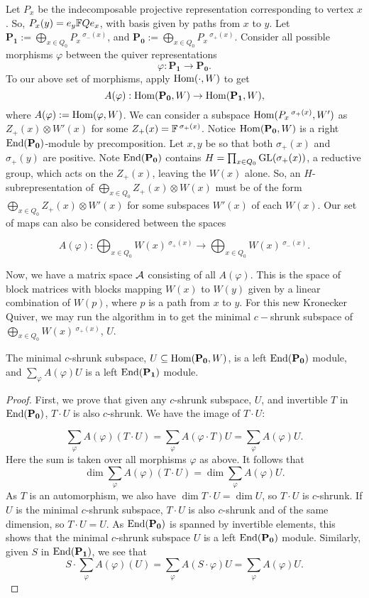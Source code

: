 Let $P_x$ be the indecomposable projective representation corresponding to vertex $x$. So, $P_x(y)=e_y{\mathbb F} Qe_x$, with basis given by paths from $x$ to $y$. Let $\mathbf{P_1}:=\bigoplus_{x\in Q_0}P_x\,^{\sigma_-(x)}$, and $\mathbf{P_0}:=\bigoplus_{x\in Q_0}P_x\,^{\sigma_+(x)}$. Consider all possible morphisms $\varphi$ between the quiver representations $$\varphi:\mathbf{P_1}\rightarrow\mathbf{P_0}.$$
To our above set of morphisms, apply $\operatorname{Hom}(\cdot,W)$ to get
$$A(\varphi):\operatorname{Hom}(\mathbf{P_0},W)\rightarrow\operatorname{Hom}(\mathbf{P_1},W),$$
where $A(\varphi):=\operatorname{Hom}(\varphi,W)$. We can consider a subspace $\operatorname{Hom}(P_x\,^{\sigma_+(x)},W')$ as $Z_+(x)\otimes W'(x)$ for some $Z_+(x)={\mathbb F}\,^{\sigma_+(x)}$. Notice $\operatorname{Hom}(\mathbf{P_0},W)$ is a right $\operatorname{End}(\mathbf{P_0})$-module by precomposition. Let $x,y$ be so that both $\sigma_+(x)$ and $\sigma_+(y)$ are positive. Note $\operatorname{End}(\mathbf{P_0})$ contains $H=\prod_{x\in Q_0}\operatorname{GL}(\sigma_+(x))$, a reductive group, which acts on the $Z_+(x)$, leaving the $W(x)$ alone. So, an $H$-subrepresentation of $\bigoplus_{x\in Q_0} Z_+(x)\otimes W(x)$ must be of the form $\bigoplus_{x\in Q_0}Z_+(x)\otimes W'(x)$ for some subspaces $W'(x)$ of each $W(x)$. Our set of maps can also be considered between the spaces 

$$A(\varphi):\bigoplus_{x\in Q_0} W(x)\,^{\sigma_+(x)}\rightarrow\bigoplus_{x\in Q_0}W(x)\,^{\sigma_-(x)}.$$

Now, we have a matrix space $\mathcal{A}$ consisting of all $A(\varphi)$. This is the space of block matrices with blocks mapping $W(x)$ to $W(y)$ given by a linear combination of $W(p)$, where $p$ is a path from $x$ to $y$. For this new Kronecker Quiver, we may run the algorithm in \cite{IQS17} to get the minimal $c-$shrunk subspace of $\bigoplus_{x\in Q_0} W(x)\,^{\sigma_+(x)}$, $U$. 

\begin{lemma}
The minimal $c$-shrunk subspace, $U\subseteq\operatorname{Hom}(\mathbf{P_0},W)$, is a left $\operatorname{End}(\mathbf{P_0})$ module, and $\sum_\varphi A(\varphi) U$ is a left $\operatorname{End}(\mathbf{P_1})$ module.
\end{lemma}\label{fixedlem}
\begin{proof}
First, we prove that given any $c$-shrunk subspace, $U$, and invertible $T$ in $\operatorname{End}(\mathbf{P_0})$, $T\cdot U$ is also $c$-shrunk. We have the image of $T \cdot U$:

$$
\sum_\varphi A(\varphi) (T \cdot U)=\sum_\varphi A(\varphi \cdot T)U =\sum_\varphi A(\varphi) U. 
$$
Here the sum is taken over all morphisms $\varphi$ as above. 
It follows that
$$
\dim \sum_\varphi A(\varphi) (T \cdot U)=\dim \sum_{\varphi} A(\varphi) U.
$$
As $T$ is an automorphism, we also have $\dim T \cdot U=\dim U$, so $T \cdot U$ is $c$-shrunk. If $U$ is the minimal $c$-shrunk subspace, $T \cdot U$ is also $c$-shrunk and of the same dimension, so $T \cdot U=U$. As $\operatorname{End}(\mathbf{P_0})$ is spanned by invertible elements, this shows that the minimal $c$-shrunk subspace $U$ is a left $\operatorname{End}(\mathbf{P_0})$ module. Similarly, given $S$ in $\operatorname{End}(\mathbf{P_1})$, we see that \[S\cdot\sum_\varphi A(\varphi) (U)=\sum_\varphi A(S\cdot\varphi)U =\sum_\varphi A(\varphi) U.\]
\end{proof}

